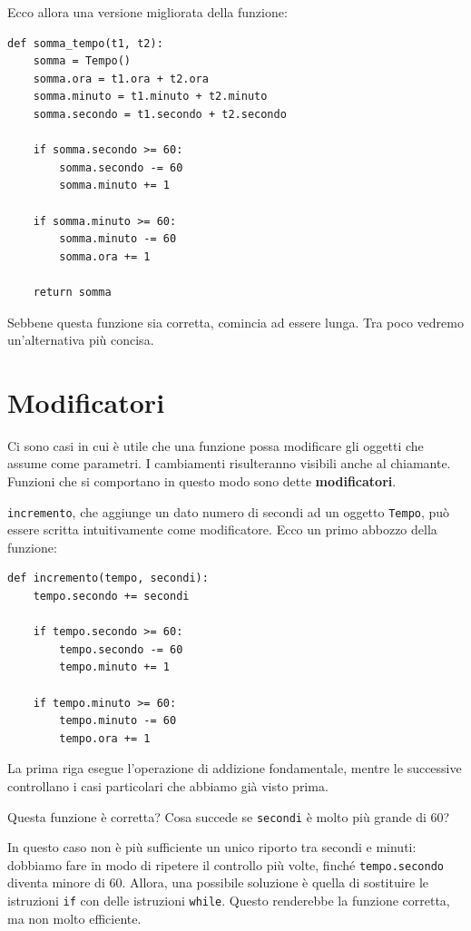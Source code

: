 \documentclass[10pt]{book}
\begin{document}
Ecco allora una versione migliorata della funzione:

\begin{verbatim}
def somma_tempo(t1, t2):
    somma = Tempo()
    somma.ora = t1.ora + t2.ora
    somma.minuto = t1.minuto + t2.minuto
    somma.secondo = t1.secondo + t2.secondo

    if somma.secondo >= 60:
        somma.secondo -= 60
        somma.minuto += 1

    if somma.minuto >= 60:
        somma.minuto -= 60
        somma.ora += 1

    return somma
\end{verbatim}
%
Sebbene questa funzione sia corretta, comincia ad essere lunga. Tra poco vedremo un'alternativa più concisa.


\section{Modificatori}
\label{increment}

Ci sono casi in cui è utile che una funzione possa modificare gli oggetti che assume come parametri. I cambiamenti risulteranno visibili anche al chiamante. Funzioni che si comportano in questo modo sono dette {\bf modificatori}.

{\tt incremento}, che aggiunge un dato numero di secondi ad un oggetto {\tt Tempo}, può essere scritta intuitivamente come modificatore. Ecco un primo abbozzo della funzione:

\begin{verbatim}
def incremento(tempo, secondi):
    tempo.secondo += secondi

    if tempo.secondo >= 60:
        tempo.secondo -= 60
        tempo.minuto += 1

    if tempo.minuto >= 60:
        tempo.minuto -= 60
        tempo.ora += 1
\end{verbatim}
%
La prima riga esegue l'operazione di addizione fondamentale, mentre le successive controllano i casi particolari che abbiamo già visto prima.

Questa funzione è corretta? Cosa succede se {\tt secondi}
è molto più grande di 60?  

In questo caso non è più sufficiente un unico riporto tra secondi e minuti: dobbiamo fare in modo di ripetere il controllo più volte, finché {\tt tempo.secondo} diventa minore di 60. Allora, una possibile soluzione è quella di sostituire le istruzioni {\tt if} con delle istruzioni {\tt while}.
Questo renderebbe la funzione corretta, ma non molto efficiente.
\end{document}
